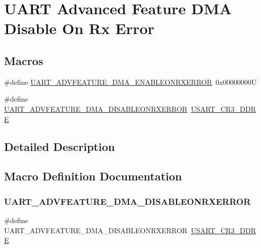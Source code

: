 \hypertarget{group___u_a_r_t___d_m_a___disable__on___rx___error}{}\section{U\+A\+RT Advanced Feature D\+MA Disable On Rx Error}
\label{group___u_a_r_t___d_m_a___disable__on___rx___error}
\subsection*{Macros}
\begin{DoxyCompactItemize}
\item 
\#define \mbox{\hyperlink{group___u_a_r_t___d_m_a___disable__on___rx___error_ga14469fd73075e481184234019a7b6734}{U\+A\+R\+T\+\_\+\+A\+D\+V\+F\+E\+A\+T\+U\+R\+E\+\_\+\+D\+M\+A\+\_\+\+E\+N\+A\+B\+L\+E\+O\+N\+R\+X\+E\+R\+R\+OR}}~0x00000000U
\item 
\#define \mbox{\hyperlink{group___u_a_r_t___d_m_a___disable__on___rx___error_gae838b9dfc0c2c082d5382973b369012b}{U\+A\+R\+T\+\_\+\+A\+D\+V\+F\+E\+A\+T\+U\+R\+E\+\_\+\+D\+M\+A\+\_\+\+D\+I\+S\+A\+B\+L\+E\+O\+N\+R\+X\+E\+R\+R\+OR}}~\mbox{\hyperlink{group___peripheral___registers___bits___definition_gae1f1b53b09336e82958755747853a753}{U\+S\+A\+R\+T\+\_\+\+C\+R3\+\_\+\+D\+D\+RE}}
\end{DoxyCompactItemize}


\subsection{Detailed Description}


\subsection{Macro Definition Documentation}
\mbox{\label{group___u_a_r_t___d_m_a___disable__on___rx___error_gae838b9dfc0c2c082d5382973b369012b}} 
\subsubsection{\texorpdfstring{UART\_ADVFEATURE\_DMA\_DISABLEONRXERROR}{UART\_ADVFEATURE\_DMA\_DISABLEONRXERROR}}
{\footnotesize\ttfamily \#define U\+A\+R\+T\+\_\+\+A\+D\+V\+F\+E\+A\+T\+U\+R\+E\+\_\+\+D\+M\+A\+\_\+\+D\+I\+S\+A\+B\+L\+E\+O\+N\+R\+X\+E\+R\+R\+OR~\mbox{\hyperlink{group___peripheral___registers___bits___definition_gae1f1b53b09336e82958755747853a753}{U\+S\+A\+R\+T\+\_\+\+C\+R3\+\_\+\+D\+D\+RE}}}

